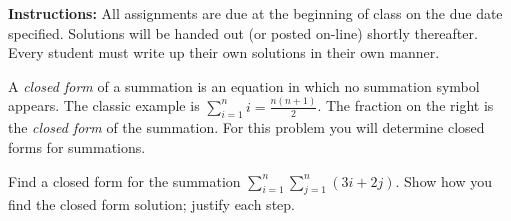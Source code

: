 \documentclass[11pt]{exam}
\begin{document}
\extrawidth{0.5in}%
\pagestyle{headandfoot}%
 \headrule
  \footrule {}

\addpoints

\noindent \textbf{Instructions:} All assignments are due at the
beginning of class on the due date specified.  Solutions will be
handed out (or posted on-line) shortly thereafter.  Every student
must write up their own solutions in their own manner.

\begin{questions}
\printanswers

\question[16] A \textit{closed form} of a summation is an equation
in which no summation symbol appears.  The classic example is
$\displaystyle \sum_{i=1}^n i = \frac{n(n+1)}{2}$.  The fraction on
the right is the \textit{closed form} of the summation.  For this
problem you will determine closed forms for summations.  %
%

Find a closed form for the summation $\displaystyle \sum_{i=1}^n \sum_{j=1}^n (3i+ 2j)$.  Show how you find the closed form solution; justify each step.



\end{questions}
\end{document}
